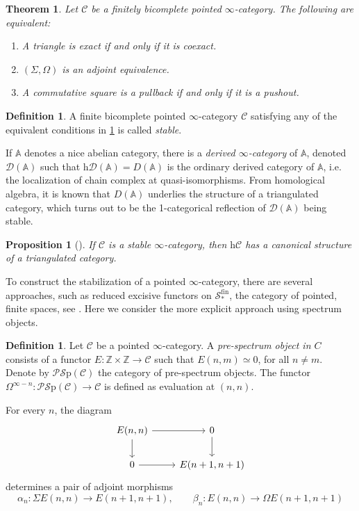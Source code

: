 \documentclass[a4paper]{book}
\newcommand{\bA}{\mathbb{A}}
\newcommand{\lC}{\mathcal{C}}
\newcommand{\lD}{\mathcal{D}}
\newcommand{\lP}{\mathcal{P}}
\newcommand{\lS}{\mathcal{S}}
\newcommand{\bZ}{\mathbb{Z}}
\newcommand{\Ho}{\mathrm{h}} %
\newcommand{\PSp}{\lP\Sp} %
\newcommand{\Sp}{\lS\mathrm{p}} %
\newtheorem{theorem}[equation]{Theorem}
\newtheorem{proposition}[equation]{Proposition}
\theoremstyle{definition}
\newtheorem{definition}[equation]{Definition}
\theoremstyle{remark}
\numberwithin{equation}{section}
\begin{document}
\begin{theorem}\label{thm:stable}
  Let $\lC$ be a finitely bicomplete pointed $\infty$-category. The following are equivalent:
  \begin{enumerate}
    \item A triangle is exact if and only if it is coexact. 
    \item $(\Sigma,\Omega)$ is an adjoint equivalence.
    \item A commutative square is a pullback if and only if it is a pushout. 
  \end{enumerate}
\end{theorem}
\begin{definition}
  A finite bicomplete pointed $\infty$-category $\lC$ satisfying any of the equivalent conditions in \cref{thm:stable} is called \emph{stable}.
\end{definition}
If $\bA$ denotes a nice abelian category, there is a \emph{derived $\infty$-category} of $\bA$, denoted $\lD(\bA)$ such that $\Ho\lD(\bA)=D(\bA)$ is the ordinary derived category of $\bA$, i.e. the localization of chain complex at quasi-isomorphisms. From homological algebra, it is known that $D(\bA)$ underlies the structure of a triangulated category, which turns out to be the 1-categorical reflection of $\lD(\bA)$ being stable. 
\begin{proposition}[{\cite[3.11]{lurie2017ha}}]
  If $\lC$ is a stable $\infty$-category, then $\Ho\lC$ has a canonical structure of a triangulated category. 
\end{proposition}To construct the stabilization of a pointed $\infty$-category, there are several approaches, such as reduced excisive functors on $\lS^\mathrm{fin}_*$, the category of pointed, finite spaces, see \cite[1.4.2.8]{lurie2017ha}. Here we consider the more explicit approach using spectrum objects.
\begin{definition}
  Let $\lC$ be a pointed $\infty$-category. A \emph{pre-spectrum object in $C$} consists of a functor $E:\bZ\times\bZ\to\lC$ such that $E(n,m)\simeq0$, for all $n\neq m$. Denote by $\PSp(\lC)$ the category of pre-spectrum objects. The functor $\Omega^{\infty-n}:\PSp(\lC)\to\lC$ is defined as evaluation at $(n,n)$. 
\end{definition}
For every $n$, the diagram \begin{equation}
  \begin{tikzcd}
    E(n,n) \arrow[r]\arrow[d] & 0 \arrow[d] \\
    0 \arrow[r] & E(n+1,n+1) 
  \end{tikzcd}
\end{equation}determines a pair of adjoint morphisms \[\alpha_n:\Sigma E(n,n)\to E(n+1,n+1),\qquad\beta_n:E(n,n)\to\Omega E(n+1,n+1)\]
\end{document}
